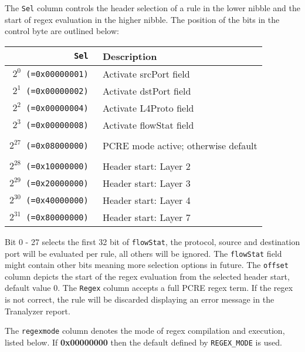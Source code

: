 \documentclass[documentation]{subfiles}
\begin{document}
The {\tt Sel} column controls the header selection of a rule in the lower nibble and the start of regex evaluation
in the higher nibble. The position of the bits in the control byte are outlined below:

\begin{longtable}{>{\tt}rl}
    \toprule
    {\bf Sel} & {\bf Description} \\
    \midrule\endhead%
    $2^{0}$  (=0x00000001) & Activate srcPort field\\
    $2^{1}$  (=0x00000002) & Activate dstPort field\\
    $2^{2}$  (=0x00000004) & Activate L4Proto field\\
    $2^{3}$  (=0x00000008) & Activate flowStat field\\
    \\
    $2^{27}$ (=0x08000000) & PCRE mode active; otherwise default\\
    \\
    $2^{28}$ (=0x10000000) & Header start: Layer 2\\
    $2^{29}$ (=0x20000000) & Header start: Layer 3\\
    $2^{30}$ (=0x40000000) & Header start: Layer 4\\
    $2^{31}$ (=0x80000000) & Header start: Layer 7\\
    \bottomrule
\end{longtable}

Bit 0 - 27 selects the first 32 bit of {\tt flowStat}, the protocol, source and destination port will be
evaluated per rule, all others will be ignored. The {\tt flowStat} field might contain other bits meaning more selection
options in future.
The {\tt offset} column depicts the start of the regex evaluation from the selected header start, default value 0.
The {\tt Regex} column accepts a full PCRE regex term. If the regex is not correct, the rule will be discarded
displaying an error message in the Tranalyzer report.

The {\tt regexmode} column denotes the mode of regex compilation and execution, listed below.
If {\bf 0x00000000} then the default defined by {\tt REGEX\_MODE} is used.
\end{document}
